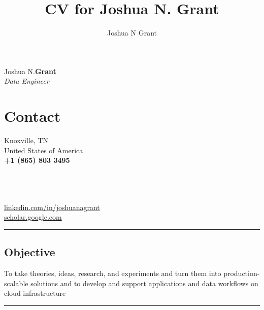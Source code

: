 \documentclass[10pt]{article}%
\author{Joshua N Grant}
\title{CV for Joshua N. Grant}
\begin{document}
\begin{minipage}[ht]{.33\linewidth}%
  \setlength{\headsep}{-10pt}%
  \setlength{\voffset}{-0.75in}%
  {\Large Joshua N.\huge\textbf{Grant}} \\
   \large \textit{Data Engineer}
\end{minipage}
\begin{minipage}[ht]{.25\linewidth}%
  \section*{\faUser{} Contact}%
  Knoxville, TN \\
  United States of America \\
  \textbf{+1 (865) 803 3495} \faMobile{} \\
\end{minipage}
\begin{minipage}[ht]{.5\linewidth}%
  \href{mailto:jngrant@live.com}{\color{linkcolor}{jngrant@live.com \faEnvelope}} \\
  \href{https://notjustadatum.blogspot.com}{\color{linkcolor}{notjustadatum.blogspot.com \faBold}} \\
  \href{https://github.com/sempervent}{\color{linkcolor}{github.com/sempervent \faGithubAlt}} \\
  \href{https://www.linkedin.com/in/joshuanagrant}{\color{linkcolor} {\small linkedin.com/in/joshuanagrant} \faLinkedin} \\
  \href{https://scholar.google.com/citations?user=vs-HJQcAAAAJ&hl=en}{\color{linkcolor} {scholar.google.com \faPencil}}
\end{minipage}
\par\noindent\rule{\textwidth}{0.4pt}
\begin{center}
\section*{\faBullseye{} Objective}%
To take theories, ideas, research, and experiments and turn them into production-scalable solutions and to develop and support applications and data workflows on cloud infrastructure
\end{center}
\par\noindent\rule{\textwidth}{0.4pt}
\end{document}
